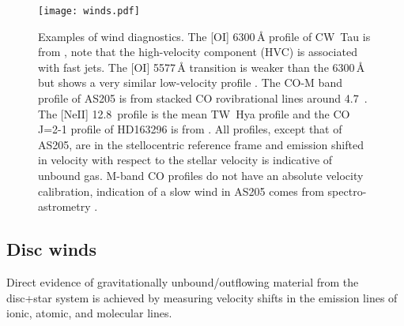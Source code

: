 \documentclass{rsos}
\begin{document}
\begin{figure}[b]
\centering
\texttt{[image: winds.pdf]}
\caption{Examples of wind diagnostics. The [OI] 6300\,\AA{} profile of CW~Tau is from \cite{2016ApJ...831..169S}, note that the high-velocity component (HVC) is associated with fast jets. The [OI] 5577\,\AA{} transition is weaker than the 6300\,\AA{} but shows a very similar low-velocity profile \cite{2016ApJ...831..169S}. The CO-M band profile of AS205 is from stacked CO rovibrational lines around 4.7\,\micron{} \cite{2015ApJ...809..167B}. The [NeII] 12.8\,\micron{} profile is the mean TW~Hya profile \cite{2011ApJ...736...13P} and the CO J=2-1 profile of HD163296 is from \cite{2013A&A...555A..73K}. All profiles, except that of AS205, are in the stellocentric reference frame and emission shifted in velocity with respect to the stellar velocity is indicative of unbound gas. M-band CO profiles do not have an absolute velocity calibration, indication of a slow wind in AS205 comes from spectro-astrometry \cite{2011ApJ...733...84P}.}\label{fig:exwinds}
\end{figure}

\subsection{Disc winds}
Direct evidence of gravitationally unbound/outflowing material from the disc+star system is achieved by measuring velocity shifts in the emission lines of ionic, atomic, and molecular lines.
\end{document}
